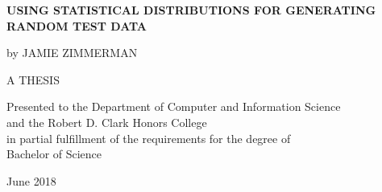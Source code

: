 \documentclass[12pt]{report}
\begin{document}
\begin{titlepage}
    \begin{center}
        \vspace*{1cm}
        
        \Large
        \textbf{USING STATISTICAL DISTRIBUTIONS FOR GENERATING RANDOM TEST DATA}
        
        \vspace{3.5cm}
        
        \large
        by
        \linebreak
        JAMIE ZIMMERMAN
        
        \vspace{3.5cm}
        
        \vfill

        \normalsize
        A THESIS
        \vspace{1.5cm}
        \begin{singlespace}
        Presented to the Department of Computer and Information Science \\
        and the Robert D. Clark Honors College \\
        in partial fulfillment of the requirements for the degree of \\
        Bachelor of Science
        \end{singlespace}
        
        \vspace{0.8cm}
        June 2018
        
    \end{center}
\end{titlepage}



\begin{romanpages}      %





\begin{center}
\tableofcontents
\end{center}





\begin{center}
\listoffigures
\end{center}


\newpage
\begin{center}
\listoftables
\end{center}


\end{romanpages}        %
\end{document}
